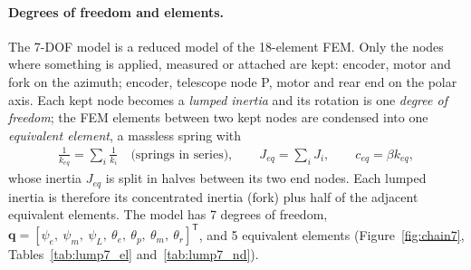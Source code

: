 \documentclass[10pt,a4paper]{article}
\numberwithin{equation}{section}
\begin{document}
\paragraph{Degrees of freedom and elements.} The 7-DOF model is a reduced model of the 18-element FEM. Only the nodes where something is applied, measured or attached are kept: encoder, motor and fork on the azimuth; encoder, telescope node P, motor and rear end on the polar axis. Each kept node becomes a \emph{lumped inertia} and its rotation is one \emph{degree of freedom}; the FEM elements between two kept nodes are condensed into one \emph{equivalent element}, a massless spring with
\begin{gather}
\frac{1}{k_{eq}} = \sum_i\frac{1}{k_i}\quad\text{(springs in series)},\qquad J_{eq} = \sum_i J_i,\qquad c_{eq} = \beta k_{eq},
\end{gather}
whose inertia $J_{eq}$ is split in halves between its two end nodes. Each lumped inertia is therefore its concentrated inertia (fork) plus half of the adjacent equivalent elements. The model has 7 degrees of freedom, $\mathbf q = [\psi_e,\ \psi_m,\ \psi_L,\ \theta_e,\ \theta_p,\ \theta_m,\ \theta_r]^{\mathsf T}$, and 5 equivalent elements (Figure~\ref{fig:chain7}, Tables~\ref{tab:lump7_el} and~\ref{tab:lump7_nd}).
\end{document}
